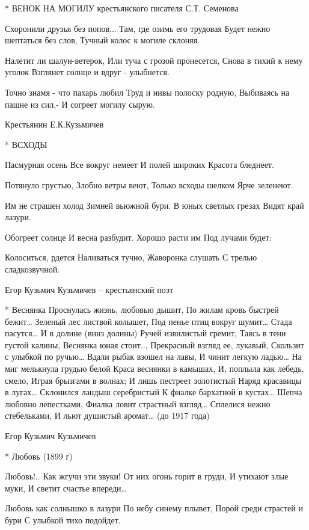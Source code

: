 * ВЕНОК НА МОГИЛУ крестьянского писателя С.Т. Семенова


Схоронили друзья без попов...
Там, где озимь его трудовая
Будет нежно шептаться без слов,
Тучный колос к могиле склоняя.

Налетит ли шалун-ветерок,
Или туча с грозой пронесется,
Снова в тихий к нему уголок
Взглянет солнце и вдруг - улыбнется.

Точно знамя - что пахарь любил
Труд и нивы полоску родную,
Выбиваясь на пашне из сил,-
И согреет могилу сырую.

Крестьянин Е.К.Кузьмичев


* ВСХОДЫ


Пасмурная осень
     Все вокруг немеет
И полей широких
     Красота бледнеет.

Потянуло грустью,
     Злобно ветры веют,
Только всходы шелком
     Ярче зеленеют.

Им не страшен холод
     Зимней вьюжной бури.
В юных светлых грезах
     Видят край лазури.

Обогреет солнце
     И весна разбудит.
Хорошо расти им
     Под лучами будет:

Колоситься, рдется
     Наливаться тучно,
Жаворонка слушать
     С трелью сладкозвучной.

Егор Кузьмич Кузьмичев – крестьянский поэт


* Веснянка
Проснулась жизнь, любовью дышит,
    По жилам кровь быстрей бежит…
Зеленый лес листвой колышет,
   Под пенье птиц вокруг шумит…
Стада пасутся… И в долине (вниз долины)
    Ручей извилистый гремит,
Таясь в тени густой калины,
    Веснянка юная стоит..,
Прекрасный взгляд ее, лукавый,
    Скользит с улыбкой по ручью…
Вдали рыбак взошел на лавы,
    И чинит легкую ладью…
На миг мелькнула грудью белой
    Краса веснянки в камышах,
И, поплыла как лебедь, смело,
    Играя брызгами в волнах;
И лишь пестреет золотистый
    Наряд красавицы в лугах…
Склонился ландыш серебристый
    К фиалке бархатной в кустах…
Шепча любовно лепестками,
    Фиалка ловит страстный взгляд…
Сплелися нежно стебельками,
    И льют душистый  аромат…
(до 1917 года)

Егор Кузьмич Кузьмичев


* Любовь (1899 г)

Любовь!.. Как жгучи эти звуки!
От них огонь горит в груди,
И утихают злые муки,
И светит счастье впереди…

Любовь как солнышко в лазури
По небу синему плывет,
Порой среди страстей и бури
С улыбкой тихо подойдет.

